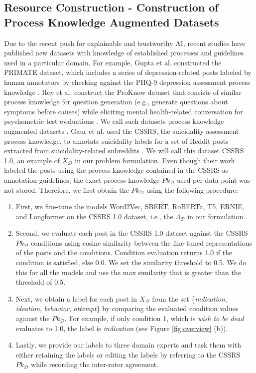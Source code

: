 \documentclass[letterpaper]{article} %
\begin{document}
\subsection{Resource Construction - Construction of Process Knowledge Augmented Datasets}
Due to the recent push for explainable and trustworthy AI, recent studies have published new datasets with knowledge of established processes and guidelines used in a particular domain. For example, Gupta et al. constructed the PRIMATE dataset, which includes a series of depression-related posts labeled by human annotators by checking against the PHQ-9 depression assessment process knowledge \cite{gupta2022learning}. Roy et al. construct the ProKnow dataset that consists of similar process knowledge for question generation (e.g., generate questions about symptoms before causes)  while eliciting mental health-related conversation for psychometric test evaluations \cite{roy2023proknow}. We call such datasets process knowledge augmented datasets \cite{sheth2022process}. Gaur et al. used the CSSRS, the suicidality assessment process knowledge, to annotate suicidality labels for a set of Reddit posts extracted from suicidality-related subreddits \cite{gaur2021characterization}. We will call this dataset CSSRS 1.0, an example of $X_{\mathcal{D}}$ in our problem formulation. Even though their work labeled the posts using the process knowledge contained in the CSSRS as annotation guidelines, the exact process knowledge $Pk_{\mathcal{D}}$ used per data point was not stored. Therefore, we first obtain the $Pk_{\mathcal{D}}$ using the following procedure:
\begin{enumerate}
    \item First, we fine-tune the models Word2Vec, SBERT, RoBERTa, T5, ERNIE, and Longformer  on the CSSRS 1.0 dataset, i.e., the $\Lambda_{\mathcal{D}}$ in our formulation \cite{mikolov2013efficient,reimers2019sentence,liu2019roberta,raffel2020exploring,zhang2019ernie,beltagy2020longformer}.
    \item Second, we evaluate each post in the CSSRS 1.0 dataset against the CSSRS $Pk_{\mathcal{D}}$ conditions using cosine similarity between the fine-tuned representations of the posts and the conditions. Condition evaluation returns 1.0 if the condition is satisfied, else 0.0. We set the similarity threshold to 0.5. We do this for all the models and use the max similarity that is greater than the threshold of 0.5.
    \item Next, we obtain a label for each post in $X_{\mathcal{D}}$ from the set \{\textit{indication}, \textit{ideation}, \textit{behavior}, \textit{attempt}\} by comparing the evaluated condition values against the $Pk_{\mathcal{D}}$. For example, if only condition 1, which is \textit{wish to be dead} evaluates to 1.0, the label is \textit{indication} (see Figure \ref{fig:overview} (b)).
    \item Lastly, we provide our labels to three domain experts and task them with either retaining the labels or editing the labels by referring to the CSSRS $Pk_{\mathcal{D}}$ while recording the inter-rater agreement.
\end{enumerate}
\end{document}
